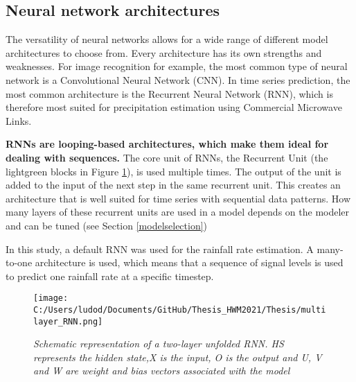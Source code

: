 \documentclass[twocolumn, 10pt, a4paper]{memoir}
\begin{document}
		\subsection{Neural network architectures} \label{NN architecture}
		The versatility of neural networks allows for a wide range of different model architectures to choose from. Every architecture has its own strengths and weaknesses. For image recognition for example, the most common type of neural network is a Convolutional Neural Network (CNN). In time series prediction, the most common architecture is the Recurrent Neural Network (RNN), which is therefore most suited for precipitation estimation using Commercial Microwave Links.
		
		\textbf{RNNs are looping-based architectures, which make them ideal for dealing with sequences.} The core unit of RNNs, the Recurrent Unit (the lightgreen blocks in Figure \ref{fig: multilayer RNN}), is used multiple times. The output of the unit is added to the input of the next step in the same recurrent unit. This creates an architecture that is well suited for time series with sequential data patterns. How many layers of these recurrent units are used in a model depends on the modeler and can be tuned (see Section \ref{modelselection})
		
		In this study, a default RNN was used for the rainfall rate estimation. A many-to-one architecture is used, which means that a sequence of signal levels is used to predict one rainfall rate at a specific timestep. 
		
		\begin{figure} 
			\center
			\texttt{[image: C:/Users/ludod/Documents/GitHub/Thesis\_HWM2021/Thesis/multilayer\_RNN.png]}
			\caption{\textit{Schematic representation of a two-layer unfolded RNN. HS represents the hidden state,X is the input, O is the output and U, V and W are weight and bias vectors associated with the model}}
			\label{fig: multilayer RNN}
		\end{figure}
		
\end{document}
